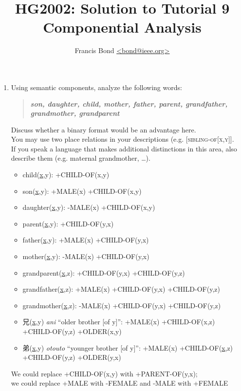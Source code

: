 \documentclass[a4paper]{article}
\title{HG2002: Solution to Tutorial 9\\  Componential Analysis}
\author{Francis Bond \url{<bond@ieee.org>}}
\date{}%
\newcommand{\lex}[1]{\textbf{\textit{#1}}}
\newcommand{\cmp}[1]{{[\textsc{#1}]}}
\newcommand{\ul}{\uline}
\begin{document}
\maketitle

\begin{enumerate}
\item Using semantic components, analyze the following words:
  \begin{quote}
  \lex{son, daughter, child, mother, father, parent, grandfather,
    grandmother, grandparent}
  \end{quote}
  Discuss whether a binary format would be an advantage here.
  \\ You may use two place relations in your descriptions (e.g. \cmp{sibling-of[x,y]}.
  \\ If you speak a language that makes additional distinctions in this area, also describe them (e.g. maternal grandmother, \ldots).

  \begin{itemize}
  \item  child(\ul{x},y): +CHILD-OF(x,y)
  \item  son(\ul{x},y): +MALE(x) +CHILD-OF(x,y)
  \item  daughter(\ul{x},y): -MALE(x) +CHILD-OF(x,y)
  \item  parent(\ul{x},y): +CHILD-OF(y,x)
  \item  father(\ul{x},y): +MALE(x) +CHILD-OF(y,x)
  \item  mother(\ul{x},y): -MALE(x) +CHILD-OF(y,x)
  \item  grandparent(\ul{x},z): +CHILD-OF(y,x) +CHILD-OF(y,z) 
  \item  grandfather(\ul{x},z): +MALE(x) +CHILD-OF(y,x)  +CHILD-OF(y,z)
  \item  grandmother(\ul{x},z): -MALE(x) +CHILD-OF(y,x)  +CHILD-OF(y,z)
    \item 兄(\ul{x},y) \textit{ani} ``older brother [of y]'':   +MALE(x)
      +CHILD-OF(x,z)  +CHILD-OF(y,z) +OLDER(x,y)
    \item 弟(\ul{x},y) \textit{otouto} ``younger brother [of y]'':   +MALE(x)
      +CHILD-OF(\ul{x},z)  +CHILD-OF(y,z) +OLDER(y,x)
  \end{itemize}
  We could replace +CHILD-OF(x,y) with +PARENT-OF(y,x);
  \\ we could replace +MALE with {-FEMALE} and -MALE with +FEMALE
  



\end{enumerate}
\end{document}
